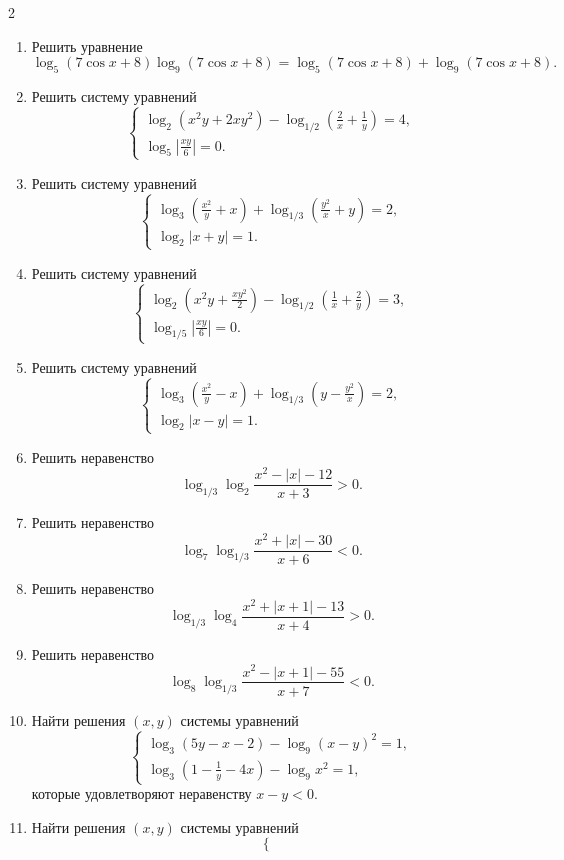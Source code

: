 \documentclass[14pt,a4paper,landscape]{article}
\begin{document}
\begin{multicols}{2}
\begin{enumerate}[label=3.\arabic*, leftmargin=1.5em]
    \item Решить уравнение $$\log_5(7\cos x+8)\log_9(7\cos x+8) = \log_5(7\cos x+8) + \log_9(7\cos x+8).$$
    \item Решить систему уравнений
    $$
    \begin{cases}
    \log_2(x^2y+2xy^2) - \log_{1/2}\left(\frac{2}{x}+\frac{1}{y}\right) = 4, \\
    \log_5\left|\frac{xy}{6}\right| = 0.
    \end{cases}
    $$
    \item Решить систему уравнений
    $$
    \begin{cases}
    \log_3\left(\frac{x^2}{y}+x\right) + \log_{1/3}\left(\frac{y^2}{x}+y\right) = 2, \\
    \log_2|x+y| = 1.
    \end{cases}
    $$
    \item Решить систему уравнений
    $$
    \begin{cases}
    \log_2\left(x^2y+\frac{xy^2}{2}\right) - \log_{1/2}\left(\frac{1}{x}+\frac{2}{y}\right) = 3, \\
    \log_{1/5}\left|\frac{xy}{6}\right| = 0.
    \end{cases}
    $$
    \item Решить систему уравнений
    $$
    \begin{cases}
    \log_3\left(\frac{x^2}{y}-x\right) + \log_{1/3}\left(y-\frac{y^2}{x}\right) = 2, \\
    \log_2|x-y| = 1.
    \end{cases}
    $$
    \item Решить неравенство $$\log_{1/3}\log_2 \frac{x^2-|x|-12}{x+3} > 0.$$
    \item Решить неравенство $$\log_7 \log_{1/3} \frac{x^2+|x|-30}{x+6} < 0.$$
    \item Решить неравенство $$\log_{1/3}\log_4 \frac{x^2+|x+1|-13}{x+4} > 0.$$
    \item Решить неравенство $$\log_8 \log_{1/3} \frac{x^2-|x+1|-55}{x+7} < 0.$$
    \item Найти решения $(x,y)$ системы уравнений
    $$
    \begin{cases}
    \log_3(5y-x-2) - \log_9(x-y)^2 = 1, \\
    \log_3\left(1-\frac{1}{y}-4x\right) - \log_9 x^2 = 1,
    \end{cases}
    $$
    которые удовлетворяют неравенству $x-y < 0$.
    \item Найти решения $(x,y)$ системы уравнений
    $$
    \begin{cases}

\end{cases}$$
\end{enumerate}
\end{multicols}
\end{document}
